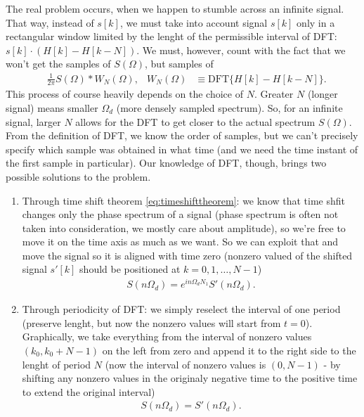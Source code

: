 \documentclass[11pt,a4paper]{report}
\theoremstyle{remark}
\theoremstyle{definition}
\newcommand{\dft}[1]{\mathrm{DFT} \{ #1 \}}
\begin{document}
				The real problem occurs, when we happen to stumble across an infinite signal. That way, instead of $s[k]$, we must take into account signal $s[k]$ only in a rectangular window limited by the lenght of the permissible interval of DFT: $s[k] \cdot (H[k] - H[k-N])$. We must, however, count with the fact that we won't get the samples of $S(\Omega)$, but samples of 
				\begin{align}
					&\frac{1}{2 \pi} S(\Omega) * W_N(\Omega), &  W_N(\Omega) &\equiv \dft{H[k] - H[k-N]}.
				\end{align}
				This process of course heavily depends on the choice of $N$. Greater $N$ (longer signal) means smaller $\Omega_d$ (more densely sampled spectrum). So, for an infinite signal, larger $N$ allows for the DFT to get closer to the actual spectrum $S(\Omega)$. From the definition of DFT, we know the order of samples, but we can't precisely specify which sample was obtained in what time (and we need the time instant of the first sample in particular). Our knowledge of DFT, though, brings two possible solutions to the problem.
				\begin{enumerate}
					\item Through time shift theorem \eqref{eq:timeshifttheorem}: we know that time shfit changes only the phase spectrum of a signal (phase spectrum is often not taken into consideration, we mostly care about amplitude), so we're free to move it on the time axis as much as we want. So we can exploit that and move the signal so it is aligned with time zero (nonzero valued of the shifted signal $s'[k]$ should be positioned at $k=0,1,\dots,N-1$)
					\begin{align}
						S(n\Omega_d) = e^{in\Omega_d N_1}S'(n \Omega_d).
					\end{align}
					
					\item Through periodicity of DFT: we simply reselect the interval of one period (preserve lenght, but now the nonzero values will start from $t=0$). Graphically, we take everything from the interval of nonzero values $(k_0, k_0+N-1)$ on the left from zero and append it to the right side to the lenght of period $N$ (now the interval of nonzero values is $(0, N-1)$ - by shifting any nonzero values in the originaly negative time to the positive time to extend the original interval)
					\begin{align}
						S(n \Omega_d) = S'(n\Omega_d).
					\end{align}
				\end{enumerate}
			
\end{document}
